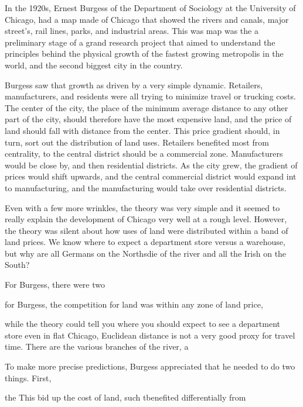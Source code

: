 In the 1920s, Ernest Burgess of the Department of Sociology at the
University of Chicago, had a map made of Chicago that showed the
rivers and canals, major street's, rail lines, parks, and industrial
areas. This was map was the a preliminary stage of a grand research
project that aimed to understand the principles behind the physical
growth of the fastest growing metropolis in the world, and the second
biggest city in the country.

Burgess saw that growth as driven by a very simple dynamic. Retailers,
manufacturers, and residents were all trying to minimize travel or
trucking costs.  The center of the city, the place of the minimum
average distance to any other part of the city, should therefore have
the most expensive land, and the price of land should fall with
distance from the center.  This price gradient should, in turn, sort
out the distribution of land uses. Retailers benefited most from
centrality, to the central district should be a commercial
zone. Manufacturers would be close by, and then residential
districts. As the city grew, the gradient of prices would shift
upwards, and the central commercial district would expand int to
manufacturing, and the manufacturing would take over residential
districts.

Even with a few more wrinkles, the theory was very simple and it
seemed to really explain the development of Chicago very well at a
rough level. However, the theory was silent about how uses of land
were distributed within a band of land prices. We know where to expect
a department store versus a warehouse, but why are all Germans on the
Northsdie of the river and all the Irish on the South?

For Burgess, there were two 




for Burgess, the competition for land was within any zone of land price, 

while the theory could tell you where you should expect to see a department store even in flat Chicago, Euclidean distance is not a very
good proxy for travel time. There are the various branches of the river, a

To make more precise predictions, Burgess appreciated that he
needed to do two things. First, 







the This bid up the cost of land, such tbenefited differentially from 



